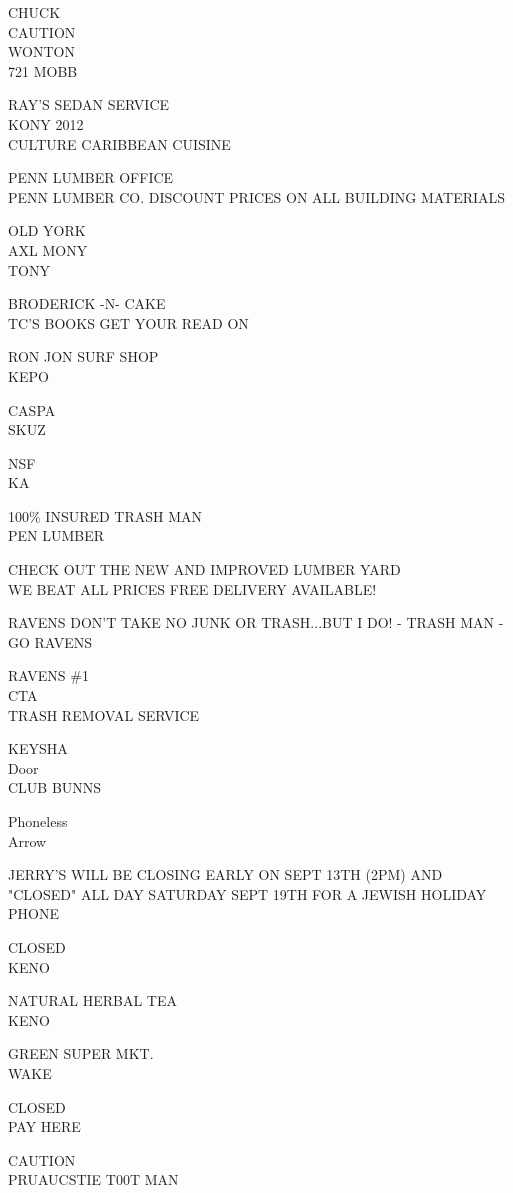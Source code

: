 \documentclass[10pt,letterpaper]{article}
\begin{document}
CHUCK\\
CAUTION\\
WONTON\\
721 MOBB

RAY'S SEDAN SERVICE\\
KONY 2012\\
CULTURE CARIBBEAN CUISINE

PENN LUMBER OFFICE\\
PENN LUMBER CO. DISCOUNT PRICES ON ALL BUILDING MATERIALS

OLD YORK\\
AXL MONY\\
TONY

BRODERICK {-}N{-} CAKE\\
TC'S BOOKS GET YOUR READ ON

RON JON SURF SHOP\\
KEPO

CASPA\\
SKUZ

NSF\\
KA

100\% INSURED TRASH MAN\\
PEN LUMBER

CHECK OUT THE NEW AND IMPROVED LUMBER YARD\\
WE BEAT ALL PRICES FREE DELIVERY AVAILABLE!

RAVENS DON'T TAKE NO JUNK OR TRASH...BUT I DO!  {-} TRASH MAN {-}\\
GO RAVENS

RAVENS \#1\\
CTA\\
TRASH REMOVAL SERVICE

KEYSHA\\
Door\\
CLUB BUNNS

Phoneless\\
Arrow

JERRY'S WILL BE CLOSING EARLY ON SEPT 13TH (2PM) AND "CLOSED" ALL DAY SATURDAY SEPT 19TH FOR A JEWISH HOLIDAY\\
PHONE

CLOSED\\
KENO

NATURAL HERBAL TEA\\
KENO

GREEN SUPER MKT.\\
WAKE

CLOSED\\
PAY HERE

CAUTION\\
PRUAUCSTIE T00T MAN
\end{document}

